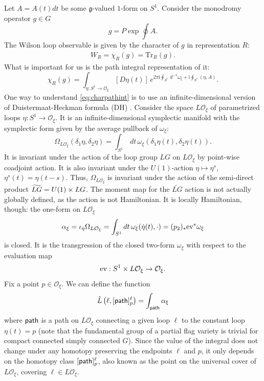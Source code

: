 \documentclass[12pt]{article}
\numberwithin{equation}{section}
\newcommand\sdtimes{\mathbin{\hbox{\hskip2pt\vrule height 4.1pt depth -.3pt
width.25pt\hskip-2pt$\times$}}}
\newcommand\beq{\begin{equation}}
\newcommand\eeq{\end{equation}}
\theoremstyle{definition}
\newcommand {\CalO} {\mathcal O}
\newcommand {\fg} {\mathfrak{g}}
\newcommand {\ii} {\mathrm{i}}
\newcommand{\Tr}{\text{Tr}}
\begin{document}
Let $A = A(t) dt$ be some $\fg$-valued $1$-form
on $S^1$. Consider the monodromy operator $g \in G$ 
\beq
g = P{\exp} \oint A.
\eeq
The Wilson loop observable is given by the character of $g$ in representation $R$:
\begin{align*}
    W_{R} = \chi_{R}(g) = {\Tr}_{R} (g).
\end{align*}
What is important for us
is the path integral representation of it:
\beq
{\chi}_{R}(g) = \int_{{\eta}: S^{1} \to {\CalO}_{\xi}} [D{\eta}(t)] \, e^{2\pi\ii \oint_{S^{1}} \,  d^{-1}{\omega}_{\xi} + \ii \oint_{S^{1}} ({\eta}, A)}.
\label{eq:charpathint}
\eeq
One way to understand \eqref{eq:charpathint} is to use an infinite-dimensional version of Duistermaat-Heckman formula (DH) \cite{DH0,DH1,DH2}. Consider the space $L{\CalO}_{\xi}$ of parametrized loops ${\eta}: S^{1} \to {\CalO}_{\xi}$. It is an infinite-dimensional symplectic manifold with the symplectic form given by the average pullback of ${\omega}_{\xi}$:
\beq
{\Omega}_{L{\CalO}_{\xi}}({\delta}_1{\eta} , {\delta}_{2} {\eta}) = \int_{S^1}\, dt\, {\omega}_{\xi} \left( {\delta}_1 {\eta}(t), {\delta}_2 {\eta}(t) \right).
\label{eq:avsymf}
\eeq
It is invariant under the action of the loop group $LG$ on $L{\CalO}_{\xi}$ by point-wise coadjoint action. It is also invariant under the $U(1)$-action ${\eta} \mapsto {\eta}^{s}$, ${\eta}^{s}(t) = {\eta}(t-s)$. Thus, $\Omega_{L{\CalO}_{\xi}}$
is invariant under the action of the semi-direct
product ${\widetilde{LG}} = U(1) \sdtimes LG$. The moment map for the ${\widetilde{LG}}$ action is not actually globally defined, as the action is not Hamiltonian. It is locally Hamiltonian, though: the one-form on $L{\CalO}_{\xi}$ 
\beq
{\alpha}_{\xi} = \iota_{{\dot\eta}} {\Omega}_{L{\CalO}_{\xi}} = \int_{S^1} dt \, {\omega}_{\xi} ( \dot\eta (t), {\cdot} ) = (p_{2})_{*} {\rm ev}^{*} {\omega}_{\xi}
\eeq
is closed. It is the transgression of the closed two-form ${\omega}_{\xi}$ with respect to the evaluation map
\beq
{\rm ev}: S^1 \times L{\CalO}_{\xi} \rightarrow {\CalO}_{\xi}.
\eeq
Fix a point $p \in {\CalO}_{\xi}$. We can define the function
\beq
{\tilde L}\left({\ell}, [{\sf path}]_{p}^{\ell}\right) = \int_{\sf path} {\alpha}_{\xi} 
\label{eq:ltilde}
\eeq
where ${\sf path}$ is a path on $L{\CalO}_{\xi}$ connecting a given loop ${\ell}$ to the constant loop ${\eta}(t) = p$ (note that the fundamental group of a partial flag variety is trivial for compact connected simply connected $G$). Since the value of the integral does not change under any homotopy preserving the endpoints $\ell$ and $p$, it only depends on the homotopy class $[{\sf path}]_{p}^{\ell}$, also known as the point  
on the universal cover of $L{\CalO}_{\xi}$, covering $\ell \in L{\CalO}_{\xi}$. 
\end{document}
